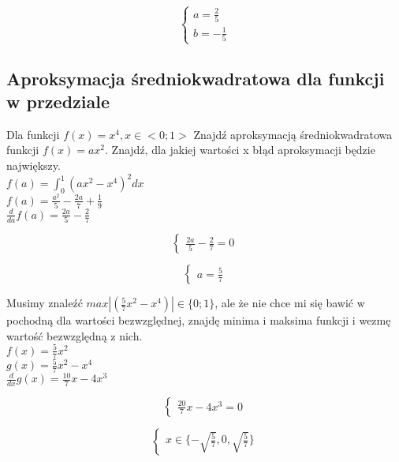 \documentclass{article}
\begin{document}
\begin{equation*}\begin{cases}
    a=\frac{2}{5}\\
    b=-\frac{1}{5}
\end{cases}\end{equation*}

\subsection{Aproksymacja średniokwadratowa dla funkcji w przedziale}
Dla funkcji $f(x)=x^4, x\in<0; 1>$ Znajdź aproksymacją średniokwadratowa funkcji $f(x)=ax^2$. Znajdź, dla jakiej wartości x błąd aproksymacji będzie największy.\\
$f(a) = \int_{0}^{1}(ax^2-x^4)^2dx$\\
$f(a) = \frac{a^2}{5}-\frac{2a}{7}+\frac{1}{9}$\\
$\frac{d}{da}f(a) = \frac{2a}{5}-\frac{2}{7}$

\begin{equation*}\begin{cases}
    \frac{2a}{5}-\frac{2}{7} = 0
\end{cases}\end{equation*}

\begin{equation*}\begin{cases}
    a = \frac{5}{7}
\end{cases}\end{equation*}

Musimy znaleźć $max|(\frac{5}{7}x^2-x^4)|\in\{0; 1\}$, ale że nie chce mi się bawić w pochodną dla wartości bezwzględnej, znajdę minima i maksima funkcji i wezmę wartość bezwzględną z nich.\\
$f(x) = \frac{5}{7}x^2$\\
$g(x) = \frac{5}{7}x^2-x^4$\\
$\frac{d}{dx}g(x) = \frac{10}{7}x-4x^3$

\begin{equation*}\begin{cases}
    \frac{20}{7}x-4x^3 = 0
\end{cases}\end{equation*}

\begin{equation*}\begin{cases}
    x \in \{-\sqrt{\frac{5}{7}}, 0, \sqrt{\frac{5}{7}}\}
\end{cases}\end{equation*}
\end{document}
